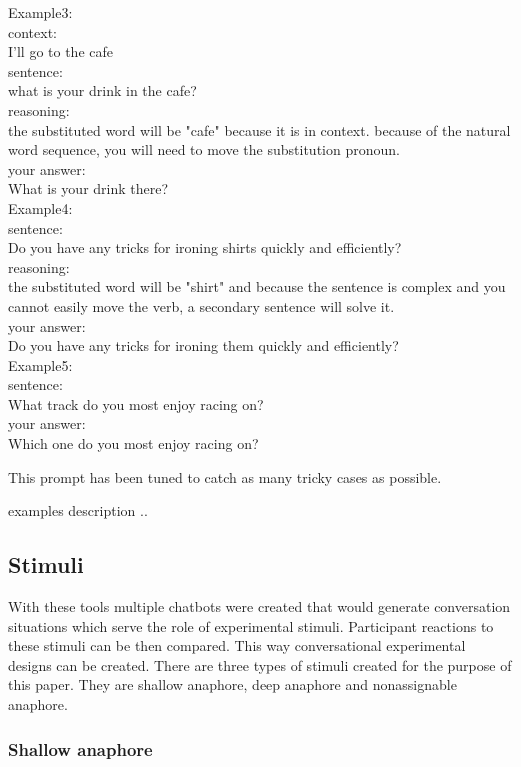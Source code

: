 \documentclass[12pt]{report}
\begin{document}
{{ Example3:\\
 context:\\
 I'll go to the cafe\\
 sentence:\\
 what is your drink in the cafe?\\
 reasoning:\\
 the substituted word will be "cafe" because it is in context. because of the natural word sequence, you will need to move the substitution pronoun.\\
 your answer:\\
 What is your drink there?\\

 Example4:\\
 sentence:\\
 Do you have any tricks for ironing shirts quickly and efficiently?\\
 reasoning:\\
 the substituted word will be "shirt" and because the sentence is complex and you cannot easily move the verb, a secondary sentence will solve it.\\
 your answer:\\
 Do you have any tricks for ironing them quickly and efficiently?\\

 Example5:\\
 sentence:\\
 What track do you most enjoy racing on?\\
 your answer:\\
 Which one do you most enjoy racing on?\\
}

This prompt has been tuned to catch as many tricky cases as possible.

examples description ..


\subsection{Stimuli}

With these tools
multiple chatbots were created
that would generate conversation situations
which serve the role of experimental stimuli.
Participant reactions to these stimuli
can be then compared.
This way conversational experimental designs can be created.
There are three types of stimuli created
for the purpose of this paper.
They are shallow anaphore, deep anaphore and nonassignable anaphore.

\subsubsection{Shallow anaphore}

}
\end{document}
